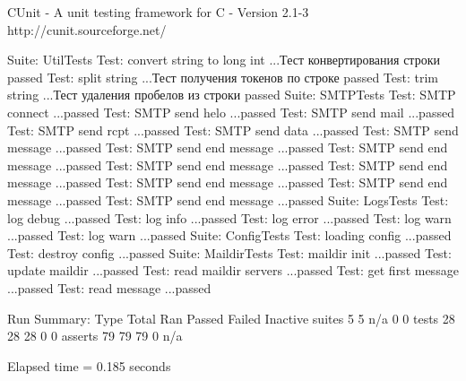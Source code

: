 

     CUnit - A unit testing framework for C - Version 2.1-3
     http://cunit.sourceforge.net/


Suite: UtilTests
  Test: convert string to long int ...Тест конвертирования строки
passed
  Test: split string ...Тест получения токенов по строке
passed
  Test: trim string ...Тест удаления пробелов из строки
passed
Suite: SMTPTests
  Test: SMTP connect ...passed
  Test: SMTP send helo ...passed
  Test: SMTP send mail ...passed
  Test: SMTP send rcpt ...passed
  Test: SMTP send data ...passed
  Test: SMTP send message ...passed
  Test: SMTP send end message ...passed
  Test: SMTP send end message ...passed
  Test: SMTP send end message ...passed
  Test: SMTP send end message ...passed
  Test: SMTP send end message ...passed
  Test: SMTP send end message ...passed
  Test: SMTP send end message ...passed
Suite: LogsTests
  Test: log debug ...passed
  Test: log info ...passed
  Test: log error ...passed
  Test: log warn ...passed
  Test: log warn ...passed
Suite: ConfigTests
  Test: loading config ...passed
  Test: destroy config ...passed
Suite: MaildirTests
  Test: maildir init ...passed
  Test: update maildir ...passed
  Test: read maildir servers ...passed
  Test: get first message ...passed
  Test: read message ...passed

Run Summary:    Type  Total    Ran Passed Failed Inactive
              suites      5      5    n/a      0        0
               tests     28     28     28      0        0
             asserts     79     79     79      0      n/a

Elapsed time =    0.185 seconds
